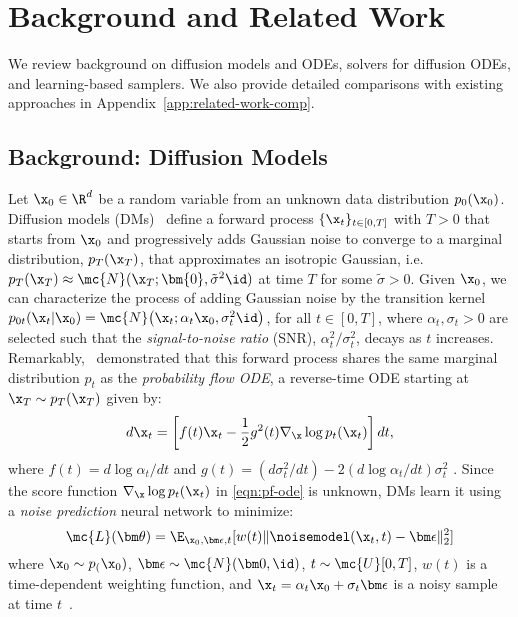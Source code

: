 \section{Background and Related Work}
We review background on diffusion models and  ODEs, solvers for diffusion ODEs, and  learning-based samplers. 
We also provide detailed comparisons with existing approaches in Appendix~\ref{app:related-work-comp}.

\subsection{Background: Diffusion Models}
Let $\x_0\in\R^d$ be a random variable from an unknown data distribution $p_0(\x_0)$. 
Diffusion models (DMs)~\cite{ho2020denoising,song2020score} define a forward process $\{\x_t\}_{t\in[0,T]}$ with $T>0$ that starts from $\x_0$ and progressively adds Gaussian noise to converge to a marginal distribution, $p_T(\x_T)$, that approximates an isotropic Gaussian, i.e. $p_T(\x_T)\approx \mc{N}(\x_T;\bm{0}, \tilde\sigma^2\id)$ at time $T$ for some $\tilde\sigma>0$.
Given $\x_0$, we can characterize the process of adding Gaussian noise by the transition kernel
$p_{0t}(\x_t|\x_0)=\mc{N}\big(\x_t; \alpha_t\x_0, \sigma_t^2 \id\big)$,
for all $t\in[0,T]$, where $\alpha_t, \sigma_t > 0$ are selected such that the \emph{signal-to-noise ratio} (SNR), $\alpha_t^2/\sigma_t^2$, decays as $t$ increases.
Remarkably,~\citet{song2020score} demonstrated that this forward process shares the same marginal distribution $p_t$ as the \emph{probability flow ODE}, a reverse-time ODE starting at $\x_T\sim p_T(\x_T)$ given by:
\begin{equation}
    \label{eqn:pf-ode}
    d\x_t = \left[f(t)\x_t - \frac{1}{2}g^2(t)\nabla_\x \log p_t(\x_t)\right] dt,
\end{equation}
where $f(t)={d\log\alpha_t}/{dt}$ and $g(t)= ({d\sigma_t^2}/{dt})-2({d\log \alpha_t}/{dt})\sigma_t^2$ \cite{kingma2021variational}.
Since the score function $\nabla_\x\log p_t(\x_t)$ in \eqref{eqn:pf-ode} is unknown, DMs learn it using a \emph{noise prediction} neural network to minimize:
\begin{equation*}
    \mc{L}(\bm\theta)=\E_{\x_0, \bm\epsilon,t}[w(t)\|\noisemodel(\x_t,t)-\bm\epsilon\|_2^2]
\end{equation*}
where $\x_0\sim p_(\x_0)$, $\bm\epsilon\sim\mc{N}(\bm 0 , \id)$, $t\sim \mc{U}[0,T]$, $w(t)$ is a time-dependent weighting function, and $\x_t=\alpha_t\x_0+\sigma_t\bm\epsilon$ is a noisy sample at time $t$~\cite{ho2020denoising,lu2022dpm}.
